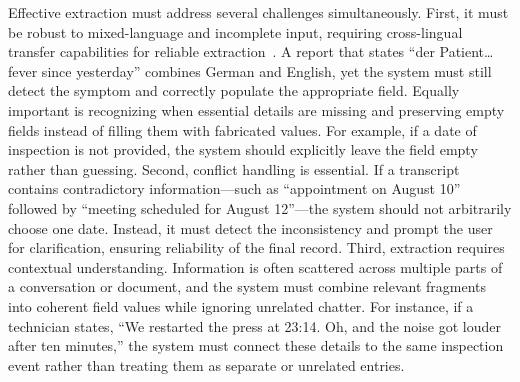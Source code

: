 Effective extraction must address several challenges simultaneously. First, it must be robust to mixed-language and incomplete input, requiring cross-lingual transfer capabilities for reliable extraction~\cite{ruder2019cross}. A report that states “der Patient… fever since yesterday” combines German and English, yet the system must still detect the symptom and correctly populate the appropriate field. Equally important is recognizing when essential details are missing and preserving empty fields instead of filling them with fabricated values. For example, if a date of inspection is not provided, the system should explicitly leave the field empty rather than guessing. Second, conflict handling is essential. If a transcript contains contradictory information—such as “appointment on August 10” followed by “meeting scheduled for August 12”—the system should not arbitrarily choose one date. Instead, it must detect the inconsistency and prompt the user for clarification, ensuring reliability of the final record. Third, extraction requires contextual understanding. Information is often scattered across multiple parts of a conversation or document, and the system must combine relevant fragments into coherent field values while ignoring unrelated chatter. For instance, if a technician states, “We restarted the press at 23:14. Oh, and the noise got louder after ten minutes,” the system must connect these details to the same inspection event rather than treating them as separate or unrelated entries.  

